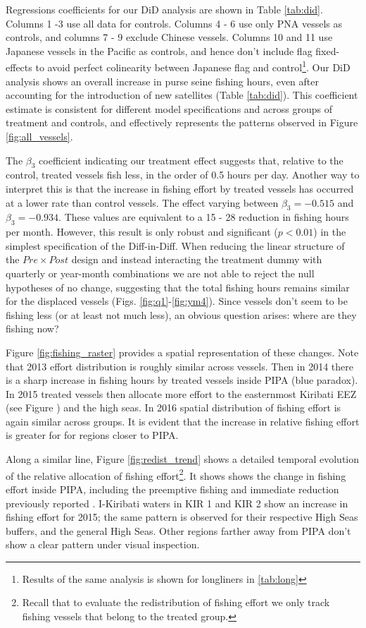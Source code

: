 \documentclass[11pt,]{article}
\let\rmarkdownfootnote\footnote%
\def\footnote{\protect\rmarkdownfootnote}
\begin{document}
Regressions coefficients for our DiD analysis are shown in Table
\ref{tab:did}. Columns 1 -3 use all data for controls. Columns 4 - 6 use
only PNA vessels as controls, and columns 7 - 9 exclude Chinese vessels.
Columns 10 and 11 use Japanese vessels in the Pacific as controls, and
hence don't include flag fixed-effects to avoid perfect colinearity
between Japanese flag and
control\footnote{Results of the same analysis is shown for longliners in \ref{tab:long}}.
Our DiD analysis shows an overall increase in purse seine fishing hours,
even after accounting for the introduction of new satellites (Table
\ref{tab:did}). This coefficient estimate is consistent for different
model specifications and across groups of treatment and controls, and
effectively represents the patterns observed in Figure
\ref{fig:all_vessels}.

The \(\beta_3\) coefficient indicating our treatment effect suggests
that, relative to the control, treated vessels fish less, in the order
of 0.5 hours per day. Another way to interpret this is that the increase
in fishing effort by treated vessels has occurred at a lower rate than
control vessels. The effect varying between \(\beta_3 = -0.515\) and
\(\beta_3 = -0.934\). These values are equivalent to a 15 - 28 reduction
in fishing hours per month. However, this result is only robust and
significant (\(p < 0.01\)) in the simplest specification of the
Diff-in-Diff. When reducing the linear structure of the
\(Pre \times Post\) design and instead interacting the treatment dummy
with quarterly or year-month combinations we are not able to reject the
null hypotheses of no change, suggesting that the total fishing hours
remains similar for the displaced vessels (Figs.
\ref{fig:q1}-\ref{fig:ym4}). Since vessels don't seem to be fishing less
(or at least not much less), an obvious question arises: where are they
fishing now?

Figure \ref{fig:fishing_raster} provides a spatial representation of
these changes. Note that 2013 effort distribution is roughly similar
across vessels. Then in 2014 there is a sharp increase in fishing hours
by treated vessels inside PIPA (blue paradox). In 2015 treated vessels
then allocate more effort to the easternmost Kiribati EEZ (see Figure
\label{fig:PNA_map}) and the high seas. In 2016 spatial distribution of
fishing effort is again similar across groups. It is evident that the
increase in relative fishing effort is greater for for regions closer to
PIPA.

Along a similar line, Figure \ref{fig:redist_trend} shows a detailed
temporal evolution of the relative allocation of fishing
effort\footnote{Recall that to evaluate the redistribution of fishing effort we only track fishing vessels that belong to the treated group.}.
It shows shows the change in fishing effort inside PIPA, including the
preemptive fishing and immediate reduction previously reported
\citep{mcdermott_2018}. I-Kiribati waters in KIR 1 and KIR 2 show an
increase in fishing effort for 2015; the same pattern is observed for
their respective High Seas buffers, and the general High Seas. Other
regions farther away from PIPA don't show a clear pattern under visual
inspection.
\end{document}
